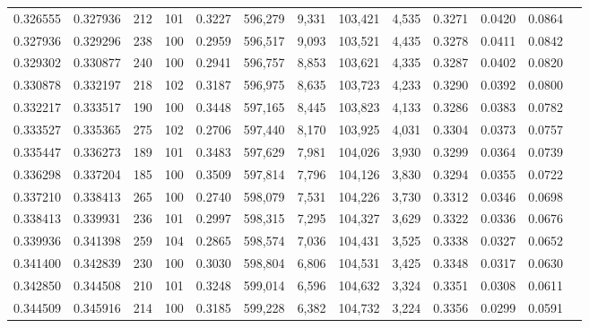 \begin{tabular}{rrrrrrrrrrrrr}
0.326555 & 0.327936 &   212 & 101 &                                     0.3227 & 596,279 &   9,331 & 103,421 &   4,535 & 0.3271 & 0.0420 & 0.0864 \\
0.327936 & 0.329296 &   238 & 100 &                                     0.2959 & 596,517 &   9,093 & 103,521 &   4,435 & 0.3278 & 0.0411 & 0.0842 \\
0.329302 & 0.330877 &   240 & 100 &                                     0.2941 & 596,757 &   8,853 & 103,621 &   4,335 & 0.3287 & 0.0402 & 0.0820 \\
0.330878 & 0.332197 &   218 & 102 &                                     0.3187 & 596,975 &   8,635 & 103,723 &   4,233 & 0.3290 & 0.0392 & 0.0800 \\
0.332217 & 0.333517 &   190 & 100 &                                     0.3448 & 597,165 &   8,445 & 103,823 &   4,133 & 0.3286 & 0.0383 & 0.0782 \\
0.333527 & 0.335365 &   275 & 102 &                                     0.2706 & 597,440 &   8,170 & 103,925 &   4,031 & 0.3304 & 0.0373 & 0.0757 \\
0.335447 & 0.336273 &   189 & 101 &                                     0.3483 & 597,629 &   7,981 & 104,026 &   3,930 & 0.3299 & 0.0364 & 0.0739 \\
0.336298 & 0.337204 &   185 & 100 &                                     0.3509 & 597,814 &   7,796 & 104,126 &   3,830 & 0.3294 & 0.0355 & 0.0722 \\
0.337210 & 0.338413 &   265 & 100 &                                     0.2740 & 598,079 &   7,531 & 104,226 &   3,730 & 0.3312 & 0.0346 & 0.0698 \\
0.338413 & 0.339931 &   236 & 101 &                                     0.2997 & 598,315 &   7,295 & 104,327 &   3,629 & 0.3322 & 0.0336 & 0.0676 \\
0.339936 & 0.341398 &   259 & 104 &                                     0.2865 & 598,574 &   7,036 & 104,431 &   3,525 & 0.3338 & 0.0327 & 0.0652 \\
0.341400 & 0.342839 &   230 & 100 &                                     0.3030 & 598,804 &   6,806 & 104,531 &   3,425 & 0.3348 & 0.0317 & 0.0630 \\
0.342850 & 0.344508 &   210 & 101 &                                     0.3248 & 599,014 &   6,596 & 104,632 &   3,324 & 0.3351 & 0.0308 & 0.0611 \\
0.344509 & 0.345916 &   214 & 100 &                                     0.3185 & 599,228 &   6,382 & 104,732 &   3,224 & 0.3356 & 0.0299 & 0.0591 \\

\end{tabular}
